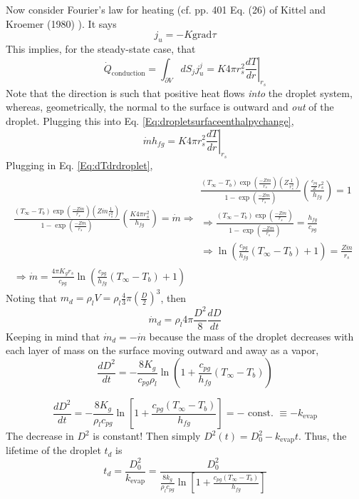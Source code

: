 \documentclass[10pt]{amsart}
\begin{document}
\begin{multicols*}{2}
Now consider Fourier's law for heating (cf. pp. 401 Eq. (26) of Kittel and Kroemer (1980) \cite{CKittelHKroemer1980}).  It says
\[
j_u = -K \text{grad}\tau
\]
This implies, for the steady-state case, that 
\[
\dot{Q}_{\text{conduction}} = \int_{\partial V} dS_j j_u^j = K 4\pi r_s^2 \left. \frac{dT}{dr} \right|_{r_s}
\]
Note that the direction is such that positive heat flows \emph{into} the droplet system, whereas, geometrically, the normal to the surface is outward and \emph{out} of the droplet.  Plugging this into Eq. \ref{Eq:dropletsurfaceenthalpychange}, 
\[
\dot{m}h_{fg} = K4\pi r_s^2 \left. \frac{dT}{dr} \right|_{r_s}
\]
Plugging in Eq. \ref{Eq:dTdrdroplet},
\[
\begin{gathered}
  \frac{ (T_{\infty} - T_b)\exp{ \left( \frac{-Z\dot{m}}{r_s} \right) } (Z\dot{m} \frac{1}{r_s^2} ) }{ 1 - \exp{ \left( \frac{-Z\dot{m}}{r_s} \right) } } \left( \frac{K4\pi r_s^2}{h_{fg}} \right) = \dot{m}  \Longrightarrow 
\begin{gathered}
  \frac{ (T_{\infty} - T_b)\exp{ \left( \frac{-Z\dot{m}}{r_s} \right) } (Z \frac{1}{r_s^2} ) }{ 1 - \exp{ \left( \frac{-Z\dot{m}}{r_s} \right) } } \left( \frac{ \frac{c_{pg}}{Z} r_s^2}{h_{fg}} \right) = 1 \\
  \Longrightarrow \frac{ (T_{\infty} - T_b)\exp{ \left( \frac{-Z\dot{m}}{r_s} \right) }  }{ 1 - \exp{ \left( \frac{-Z\dot{m}}{r_s} \right) } }  = \frac{h_{fg}}{c_{pg}} \\
\Longrightarrow  \ln{ \left( \frac{c_{pg}}{h_{fg}} (T_{\infty} - T_b) + 1 \right) } = \frac{Z\dot{m}}{r_s} 
\end{gathered} \\
\Longrightarrow \dot{m} = \frac{ 4\pi K_g r_s }{c_{pg}} \ln{ \left( \frac{c_{pg}}{h_{fg}}(T_{\infty} - T_b) + 1 \right) }
\end{gathered}
\]
Noting that $m_d = \rho_l V = \rho_l \frac{4}{3} \pi \left( \frac{  D}{2} \right)^3$, then 
\[
\dot{m}_d = \rho_l 4\pi \frac{D^2}{8} \frac{dD}{dt}
\]
Keeping in mind that $\dot{m}_d = - \dot{m}$ because the mass of the droplet decreases with each layer of mass on the surface moving outward and away as a vapor,
\[
\frac{dD^2}{dt} = - \frac{ 8 K_g}{ c_{pg} \rho_l } \ln{ \left( 1 + \frac{c_{pg}}{h_{fg}} (T_{\infty} - T_b) \right) }
\]




\[
\frac{dD^2}{dt} = -\frac{ 8 K_g}{\rho_l c_{pg}} \ln{ \left[ 1 + \frac{ c_{pg} (T_{\infty} - T_b)}{h_{fg} } \right] } = -\text{ const. } \equiv -k_{\text{evap}}
\]
The decrease in $D^2$ is constant!  Then simply $D^2(t) = D_0^2 - k_{\text{evap}}t$.  Thus, the lifetime of the droplet $t_d$ is
\[
t_d = \frac{D_0^2}{k_{\text{evap}}} = \frac{D_0^2}{ \frac{8k_g}{ \rho_l c_{pg}} \ln{ \left[ 1 + \frac{c_{pg} (T_{\infty} - T_b) }{ h_{fg}} \right] }  }
\]


\end{multicols*}
\end{document}
